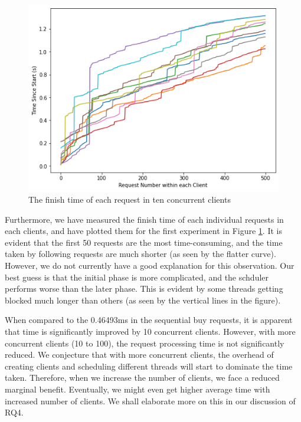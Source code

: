 \documentclass[letterpaper,11pt,twocolumn]{article}
\begin{document}
\begin{figure}[thb]
    \centering
    \includegraphics[width=\linewidth]{time_buy_10.png}
    \caption{The finish time of each request in ten concurrent clients}
    \label{fig:time-buy-10}
\end{figure}


Furthermore, we have measured the finish time of each individual requests in each clients, and have plotted them for the first experiment in Figure \ref{fig:time-buy-10}. It is evident that the first 50 requests are the most time-consuming, and the time taken by following requests are much shorter (as seen by the flatter curve). However, we do not currently have a good explanation for this observation. Our best guess is that the initial phase is more complicated, and the schduler performs worse than the later phase. This is evident by some threads getting blocked much longer than others (as seen by the vertical lines in the figure).

When compared to the 0.46493ms in the sequential buy requests, it is apparent that time is significantly improved by 10 concurrent clients. 
However, with more concurrent clients (10 to 100), the request processing time is not significantly reduced. 
We conjecture that with more concurrent clients, the overhead of creating clients and scheduling different threads will start to dominate the time taken. Therefore, when we increase the number of clients, we face a reduced marginal benefit. Eventually, we might even get higher average time with increased number of clients. We shall elaborate more on this in our discussion of RQ4.
\end{document}
